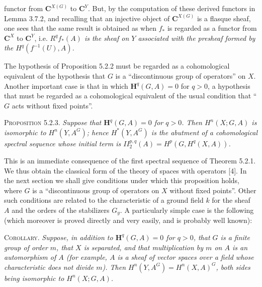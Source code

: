 \clearpage
{}

\noindent functor from ${\mathbf C}^{X(G)}$ to ${\mathbf C}^Y$. But, by the computation of these
derived functors in Lemma 3.7.2, and recalling that an injective object of
${\mathbf C}^{X(G)}$ is a flasque sheaf, one sees that the same result is obtained as
when $f_*$ is regarded as a functor from ${\mathbf C}^X$ to ${\mathbf C}^Y$, i.e.
\textit{$R^qf_*(A)$ is the sheaf on $Y$ associated with the presheaf formed
by the $H^q(f^{-1}(U),A)$.}

The hypothesis of Proposition 5.2.2 must be regarded as a cohomological
equivalent of the hypothesis that $G$ is a ``discontinuous group of
operators'' on $X$. Another important case is that in which
$\mathbf H^q(G,A)=0$ for $q>0$, a hypothesis that must be regarded as a
cohomological equivalent of the usual condition that ``$G$ acts without
fixed points''.

\textsc{Proposition 5.2.3.} \textit{Suppose that
$\mathbf H^q(G,A)=0$ for $q>0$. Then $H^n(X;G,A)$ is isomorphic to
$H^n(Y,A^G)$; hence $H^*(Y,A^G)$ is the abutment of a cohomological spectral
sequence whose initial term is
$II_2^{p,q}(A)=H^p(G,H^q(X,A))$.}

This is an immediate consequence of the first spectral sequence of Theorem
5.2.1.
We thus obtain the classical form of the theory of spaces with operators [4].
In the next section we shall give conditions under which this proposition
holds, where $G$ is a ``discontinuous group of operators on $X$ without fixed
points''. Other such conditions are related to the characteristic of a ground
field $k$ for the sheaf $A$ and the orders of the stabilizers $G_y$. A
particularly simple case is the following (which moreover is proved directly
and very easily, and is probably well known):

\textsc{Corollary.} \textit{Suppose, in addition to
$\mathbf H^q(G,A)=0$ for $q>0$, that $G$ is a finite group of order $m$, that
$X$ is separated, and that multiplication by $m$ on $A$ is an automorphism of
$A$ (for example, $A$ is a sheaf of vector spaces over a field whose
characteristic does not divide $m$). Then
$H^n(Y,A^G)=H^n(X,A)^G$, both sides being isomorphic to $H^n(X;G,A)$.}

